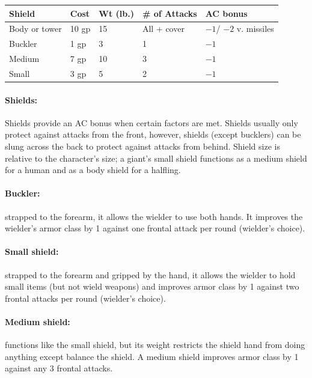 \begin{multicols}{2}

\noindent
\begin{minipage}{\columnwidth}

\label{shields}
\noindent
\begin{tabular}{|p{}|p{}|p{}|p{}|p{}|}
\hline
Shield			& Cost	& Wt (lb.)	& \# of Attacks	& AC bonus \\
\hline\hline
\rowcolor[gray]{.9}Body or tower	& 10 gp	& 15	& All + cover		& $-1$/ $-2$ v. missiles \\
Buckler			& 1 gp	& 3		& 1					& $-1$ \\
\rowcolor[gray]{.9}Medium			& 7 gp	& 10	& 3					& $-1$ \\
Small			& 3 gp	& 5		& 2					& $-1$ \\
\hline
\end{tabular}

\end{minipage}

\paragraph{Shields:}  Shields provide an AC bonus when certain factors are met.  Shields usually only protect against attacks from the front, however, shields (except bucklers) can be slung across the back to protect against attacks from behind.  Shield size is relative to the character's size; a giant's small shield functions as a medium shield for a human and as a body shield for a halfling.

\paragraph{Buckler:} strapped to the forearm, it allows the wielder to use both hands.  It improves the wielder's armor class by 1 against one frontal attack per round (wielder's choice).  

\paragraph{Small shield:} strapped to the forearm and gripped by the hand, it allows the wielder to hold small items (but not wield weapons) and improves armor class by 1 against two frontal attacks per round (wielder's choice).  

\paragraph{Medium shield:} functions like the small shield, but its weight restricts the shield hand from doing anything except balance the shield.  A medium shield improves armor class by 1 against any 3 frontal attacks.


\end{multicols}
